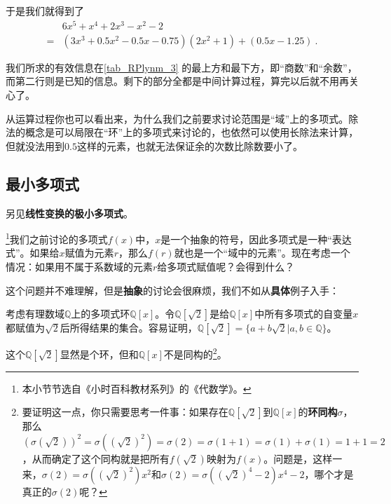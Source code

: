 于是我们就得到了
\begin{equation}
\begin{aligned}
&6x^5+x^4+2x^3-x^2-2 \\
= &(3x^3+0.5x^2-0.5x-0.75)(2x^2+1)+(0.5x-1.25)~.
\end{aligned}
\end{equation}

我们所求的有效信息在\autoref{tab_RPlynm_3} 的最上方和最下方，即“商数”和“余数”，而第二行则是已知的信息。剩下的部分全都是中间计算过程，算完以后就不用再关心了。

从运算过程你也可以看出来，为什么我们之前要求讨论范围是“域”上的多项式。除法的概念是可以局限在“环”上的多项式来讨论的，也依然可以使用长除法来计算，但就没法用到$0.5$这样的元素，也就无法保证余的次数比除数要小了。





\subsection{最小多项式}\label{sub_RPlynm_1}

另见\textbf{线性变换的极小多项式}。

\footnote{本小节节选自《小时百科教材系列》的《代数学》。}我们之前讨论的多项式$f(x)$中，$x$是一个抽象的符号，因此多项式是一种“表达式”。如果给$x$赋值为元素$r$，那么$f(r)$就也是一个“域中的元素”。现在考虑一个情况：如果用不属于系数域的元素$r$给多项式赋值呢？会得到什么？

这个问题并不难理解，但是\textbf{抽象}的讨论会很麻烦，我们不如从\textbf{具体}例子入手：

\begin{example}{}

考虑有理数域$\mathbb{Q}$上的多项式环$\mathbb{Q}[x]$。令$\mathbb{Q}[\sqrt{2}]$是给$\mathbb{Q}[x]$中所有多项式的自变量$x$都赋值为$\sqrt{2}$后所得结果的集合。容易证明，$\mathbb{Q}[\sqrt{2}]=\{ a+b\sqrt{2}|a, b\in\mathbb{Q} \}$。

这个$\mathbb{Q}[\sqrt{2}]$显然是个环，但和$\mathbb{Q}[x]$不是同构的\footnote{要证明这一点，你只需要思考一件事：如果存在$\mathbb{Q}[\sqrt{2}]$到$\mathbb{Q}[x]$的\textbf{环同构}$\sigma$，那么$(\sigma(\sqrt{2}))^2=\sigma((\sqrt{2})^2)=\sigma(2)=\sigma(1+1)=\sigma(1)+\sigma(1)=1+1=2$，从而确定了这个同构就是把所有$f(\sqrt{2})$映射为$f(x)$。问题是，这样一来，$\sigma(2)=\sigma((\sqrt{2})^2)x^2$和$\sigma(2)=\sigma((\sqrt{2})^4-2)x^4-2$，哪个才是真正的$\sigma(2)$呢？}。


\end{example}


